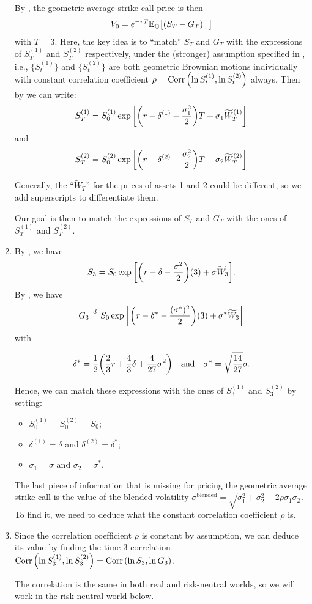 \begin{enumerate}
By , the geometric average strike call price
is then
\[
V_0=e^{-rT}\mathbb{E}_{\mathbb{Q}}\qty[\qty(S_T-G_T)_{+}]
\]
with \(T=3\). Here, the key idea is to ``match'' \(S_T\) and \(G_T\) with the
expressions of \(S_T^{(1)}\) and \(S_T^{(2)}\) respectively, under the
(stronger) assumption specified in , i.e.,
\(\{S_t^{(1)}\}\) and \(\{S_t^{(2)}\}\) are both geometric Brownian motions
individually with constant correlation coefficient \(\rho=\operatorname{Corr}\qty(\ln
S_t^{(1)},\ln S_t^{(2)})\) always. Then by  we can
write:
\[
S_T^{(1)}=S_0^{(1)}\exp\qty[\qty(r-\delta^{(1)}-\frac{\sigma_1^2}{2})T+\sigma_1\widetilde{W}_T^{(1)}]
\]
and
\[
S_T^{(2)}=S_0^{(2)}\exp\qty[\qty(r-\delta^{(2)}-\frac{\sigma_2^2}{2})T+\sigma_2\widetilde{W}_T^{(2)}]
\]
\begin{note}
Generally, the ``\(\widetilde{W}_T\)'' for the prices of assets 1 and 2 could
be different, so we add superscripts to differentiate them.
\end{note}

Our goal is then to match the expressions of \(S_T\) and \(G_T\) with the ones
of \(S_T^{(1)}\) and \(S_T^{(2)}\).


\item By , we have
\[
S_3=S_0\exp\qty[\qty(r-\delta-\frac{\sigma^2}{2})(3)+\sigma\widetilde{W}_3].
\]
By , we have
\[
G_3\overset{d}= S_0\exp\qty[\qty(r-\delta^{*}-\frac{(\sigma^{*})^2}{2})(3)+\sigma^{*}\widetilde{W}_3]
\]
with

\[
\delta^{*}=\frac{1}{2}\qty(\frac{2}{3}r+\frac{4}{3}\delta+\frac{4}{27}\sigma^2)
\qqtext{and}
\sigma^{*}=\sqrt{\frac{14}{27}}\sigma.
\]

Hence, we can match these expressions with the ones of \(S_3^{(1)}\) and
\(S_3^{(2)}\) by setting:
\begin{itemize}
\item \(S_0^{(1)}=S_0^{(2)}=S_0\);
\item \(\delta^{(1)}=\delta\) and \(\delta^{(2)}=\delta^*\);
\item \(\sigma_1=\sigma\) and \(\sigma_2=\sigma^*\).
\end{itemize}
The last piece of information that is missing for pricing the geometric average
strike call is the value of the blended volatility
\(\sigma^{\mathrm{blended}}=\sqrt{\sigma_1^2+\sigma_2^2-2\rho\sigma_1\sigma_2}\).
To find it, we need to deduce what the constant correlation coefficient
\(\rho\) is.

\item Since the correlation coefficient \(\rho\) is constant by assumption, we
can deduce its value by finding the time-\(3\) correlation \(\operatorname{Corr}\qty(\ln
S_3^{(1)},\ln S_3^{(2)})=\operatorname{Corr}\qty(\ln S_3,\ln G_3)\). \begin{note}
The correlation is the same in both real and risk-neutral worlds, so we will
work in the risk-neutral world below.
\end{note}


\end{enumerate}
